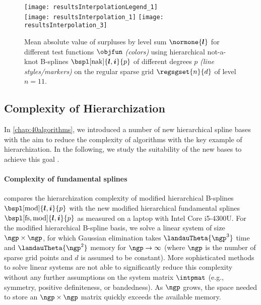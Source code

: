 \begin{figure}
  \texttt{[image: resultsInterpolationLegend\_1]}\\[2mm]%
  \texttt{[image: resultsInterpolation\_1]}%
  \hfill%
  \texttt{[image: resultsInterpolation\_3]}%
  \caption[Decay of surpluses for different test functions]{%
    Mean absolute value of surpluses by level sum $\normone{\*l}$
    for different test functions $\objfun$ \emph{(colors)}
    using hierarchical not-a-knot B-splines
    $\bspl[\nak]{\*l,\*i}{p}$ of different degrees $p$
    \emph{(line styles/markers)} on
    the regular sparse grid $\regsgset{n}{d}$ of level $n = 11$.%
  }%
  \label{fig:resultsDecaySurpluses}%
\end{figure}



\subsection{Complexity of Hierarchization}
\label{sec:543complexity}

In \cref{chap:40algorithms}, we introduced a number of new
hierarchical spline bases with the aim to reduce the complexity
of algorithms with the key example of hierarchization.
In the following, we study the suitability of the new bases
to achieve this goal \cite{Valentin18Fundamental}.

\paragraph{Complexity of fundamental splines}

 compares the hierarchization complexity of
modified hierarchical B-splines $\bspl[\modified]{\*l,\*i}{p}$ with the new
modified hierarchical fundamental splines $\bspl[\fs,\modified]{\*l,\*i}{p}$
as measured on a laptop with Intel Core i5-4300U.
For the modified hierarchical B-spline basis,
we solve a linear system of size $\ngp \times \ngp$,
for which Gaussian elimination takes
$\landauTheta{\ngp^3}$ time and $\landauTheta{\ngp^2}$ memory for
$\ngp \to \infty$ (where $\ngp$ is the number of sparse grid points and
$d$ is assumed to be constant).
More sophisticated methods to solve linear systems
are not able to significantly
reduce this complexity without any further assumptions on the system matrix
$\intpmat$ (e.g., symmetry, positive definiteness, or bandedness).
As $\ngp$ grows,
the space needed to store an $\ngp \times \ngp$ matrix quickly exceeds
the available memory.

